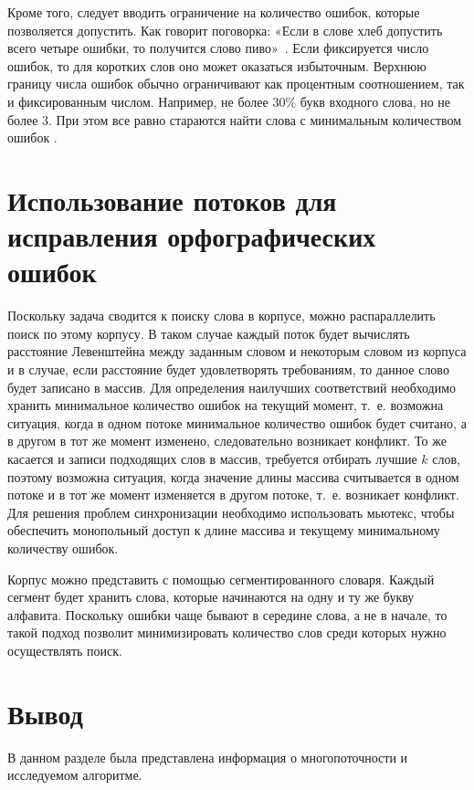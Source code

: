 Кроме того, следует вводить ограничение на количество ошибок, которые позволяется допустить. Как говорит поговорка: «Если в слове хлеб допустить всего четыре ошибки, то получится слово пиво»~\cite{miem}. 
Если фиксируется число ошибок, то для коротких слов оно может оказаться избыточным.
Верхнюю границу числа ошибок обычно ограничивают как процентным соотношением, так и фиксированным числом. 
Например, не более $30\%$ букв входного слова, но не более 3.
При этом все равно стараются найти слова с минимальным количеством ошибок \cite{miem}.

\section{Использование потоков для исправления орфографических ошибок}

Поскольку задача сводится к поиску слова в корпусе, можно распараллелить поиск по этому корпусу. В таком случае каждый поток будет вычислять расстояние Левенштейна между заданным словом и некоторым словом из корпуса и в случае, если расстояние будет удовлетворять требованиям, то данное слово будет записано в массив. Для определения наилучших соответствий необходимо хранить минимальное количество ошибок на текущий момент, т.~е. возможна ситуация, когда в одном потоке минимальное количество ошибок будет считано, а в другом в тот же момент изменено, следовательно возникает конфликт. То же касается и записи подходящих слов в массив, требуется отбирать лучшие $k$ слов, поэтому возможна ситуация, когда значение длины массива считывается в одном потоке и в тот же момент изменяется в другом потоке, т.~е. возникает конфликт. Для решения проблем синхронизации необходимо использовать мьютекс, чтобы обеспечить монопольный доступ к длине массива и текущему минимальному количеству ошибок. 

Корпус можно представить с помощью сегментированного словаря. Каждый сегмент будет хранить слова, которые начинаются на одну и ту же букву алфавита. Поскольку ошибки чаще бывают в середине слова, а не в начале, то такой подход позволит минимизировать количество слов среди которых нужно осуществлять поиск.

\section*{Вывод} 
В данном разделе была представлена информация о многопоточности
и исследуемом алгоритме.